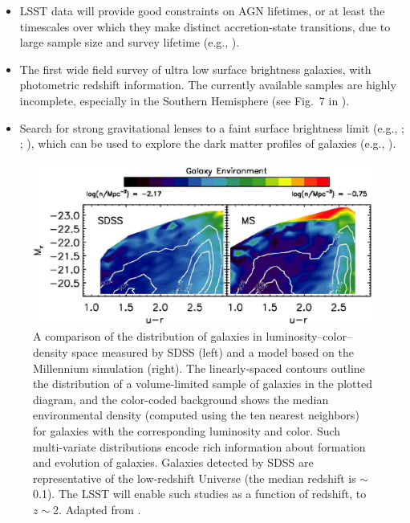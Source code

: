 \begin{itemize}
\item LSST data will provide good constraints on AGN lifetimes, or at least the timescales over which
         they make distinct accretion-state transitions, due to large sample
         size and survey lifetime (e.g., \cite{Martini2003}).
\item The first wide field survey of ultra low surface brightness galaxies, with
      photometric redshift information. The currently available samples are highly
      incomplete, especially in the Southern Hemisphere (see Fig.~7 in \cite{Belokurov2007a}).
\item Search for strong gravitational lenses to a faint surface
  brightness limit (e.g., \cite{Bartelmann1998}; \cite{Tyson1998};
  \cite{Belokurov2007b}), which can be used to
  explore the dark matter profiles of galaxies (e.g., \cite{Treu2006}).
\end{itemize}


\begin{figure}
\includegraphics[width=1.0\hsize,clip]{cowan.pdf}
\caption{A comparison of the distribution of galaxies in
luminosity--color--density space measured by SDSS (left) and a model based
on the Millennium simulation (right). The linearly-spaced contours outline
the distribution of a volume-limited sample of galaxies in the plotted diagram, and
the color-coded background shows the median environmental density (computed
using the ten nearest neighbors) for galaxies
with the corresponding luminosity and color. Such multi-variate distributions
encode rich information about formation and evolution of galaxies. Galaxies
detected by SDSS are representative of the low-redshift Universe (the median
redshift is $\sim$0.1). The LSST will enable such studies as a function of
redshift, to $z\sim$2. Adapted from \cite{Cowan2008}.}
\label{Fig:cowan}
\end{figure}


